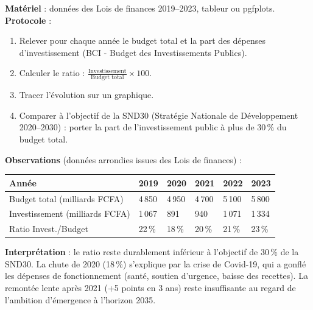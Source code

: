 \documentclass[11pt]{article}
\begin{document}
\begin{experience}
\textbf{Matériel} : données des Lois de finances 2019--2023, tableur ou pgfplots.\\
\textbf{Protocole} :
\begin{enumerate}
\item Relever pour chaque année le budget total et la part des dépenses d'investissement (BCI - Budget des Investissements Publics).
\item Calculer le ratio : $\frac{\text{Investissement}}{\text{Budget total}} \times 100$.
\item Tracer l'évolution sur un graphique.
\item Comparer à l'objectif de la SND30 (Stratégie Nationale de Développement 2020--2030) : porter la part de l'investissement public à plus de 30\,\% du budget total.
\end{enumerate}
\textbf{Observations} (données arrondies issues des Lois de finances) :
\begin{center}
\begin{tabularx}{\linewidth}{|l|X|X|X|X|X|}\hline
\rowcolor{popblueL} Année & 2019 & 2020 & 2021 & 2022 & 2023 \\ \hline
Budget total (milliards FCFA) & 4\,850 & 4\,950 & 4\,700 & 5\,100 & 5\,800 \\ \hline
Investissement (milliards FCFA) & 1\,067 & 891 & 940 & 1\,071 & 1\,334 \\ \hline
Ratio Invest./Budget & 22\,\% & 18\,\% & 20\,\% & 21\,\% & 23\,\% \\ \hline
\end{tabularx}
\end{center}
\textbf{Interprétation} : le ratio reste durablement inférieur à l'objectif de 30\,\% de la SND30. La chute de 2020 (18\,\%) s'explique par la crise de Covid-19, qui a gonflé les dépenses de fonctionnement (santé, soutien d'urgence, baisse des recettes). La remontée lente après 2021 (+5 points en 3 ans) reste insuffisante au regard de l'ambition d'émergence à l'horizon 2035.
\end{experience}
\end{document}
